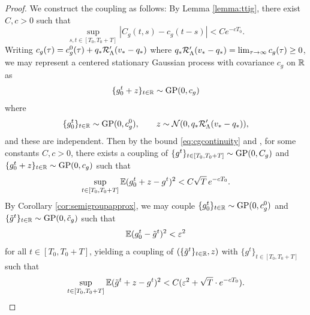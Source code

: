 \begin{proof}
We construct the coupling as follows: By Lemma \ref{lemma:ttig}, there exist
$C,c>0$ such that
\[\sup_{s,t \in [T_0,T_0+T]} |C_g(t,s)-c_g(t-s)|<Ce^{-cT_0}.\]
Writing $c_g(\tau)=c_g^0(\tau)+q_*\mathcal{R}_\Lambda'(v_*-q_*)$
where $q_*\mathcal{R}_\Lambda'(v_*-q_*)=\lim_{\tau \to \infty} c_g(\tau) \geq 0$,
we may represent a centered stationary Gaussian process with covariance
$c_g$ on $\mathbb{R}$ as
\[\{g_0^t+z\}_{t \in \mathbb{R}} \sim \operatorname{GP}(0,c_g)\]
where
\[\{g_0^t\}_{t \in \mathbb{R}} \sim \operatorname{GP}(0,c_g^0),
\qquad z \sim \mathcal{N}(0,q_*\mathcal{R}_\Lambda'(v_*-q_*)),\]
and these are independent. Then by the bound \eqref{eq:cgcontinuity} and
\cite[Lemma D.1]{fan2025dynamicalII}, for some constants
$C,c>0$, there exists a coupling of $\{g^t\}_{t \in [T_0,T_0+T]}
\sim \operatorname{GP}(0,C_g)$ and $\{g_0^t+z\}_{t \in \mathbb{R}} \sim \operatorname{GP}(0,c_g)$ such that
\[\sup_{t \in [T_0,T_0+T]} \mathbb{E}(g_0^t+z-g^t)^2<C\sqrt{T}\,e^{-cT_0}.\]
By Corollary \ref{cor:semigroupapprox}, we may couple $\{g_0^t\}_{t \in \mathbb{R}} \sim
\operatorname{GP}(0,c_g^0)$ and $\{\tilde g^t\}_{t \in \mathbb{R}} \sim \operatorname{GP}(0,\tilde c_g)$
such that
\[\mathbb{E}(g_0^t-\tilde g^t)^2<\varepsilon^2\]
for all $t \in [T_0,T_0+T]$, yielding a coupling of
$(\{\tilde g^t\}_{t \in \mathbb{R}},z)$ with $\{g^t\}_{t \in [T_0,T_0+T]}$
such that
\begin{equation}\label{eq:finalgcoupling}
\sup_{t \in [T_0,T_0+T]} \mathbb{E}(\tilde g^t+z-g^t)^2
<C(\varepsilon^2+\sqrt{T} \cdot e^{-cT_0}).
\end{equation}


\end{proof}
